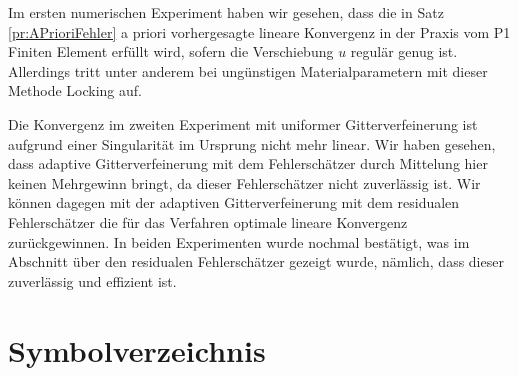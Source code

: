 \documentclass{scrartcl}
\begin{document}
Im ersten numerischen Experiment haben wir gesehen, dass die in Satz \ref{pr:APrioriFehler} a priori vorhergesagte lineare Konvergenz in der Praxis vom P1 Finiten Element erfüllt wird, sofern die Verschiebung $u$ regulär genug ist. Allerdings tritt unter anderem bei ungünstigen Materialparametern mit dieser Methode Locking auf. 

Die Konvergenz im zweiten Experiment mit uniformer Gitterverfeinerung ist aufgrund einer Singularität im Ursprung nicht mehr linear. Wir haben gesehen, dass adaptive Gitterverfeinerung mit dem Fehlerschätzer durch Mittelung hier keinen Mehrgewinn bringt, da dieser Fehlerschätzer nicht zuverlässig ist. Wir können dagegen mit der adaptiven Gitterverfeinerung mit dem residualen Fehlerschätzer die für das Verfahren optimale lineare Konvergenz zurückgewinnen. In beiden Experimenten wurde nochmal bestätigt, was im Abschnitt über den residualen Fehlerschätzer gezeigt wurde, nämlich, dass dieser zuverlässig und effizient ist.


\clearpage

\section*{Symbolverzeichnis}
\end{document}
